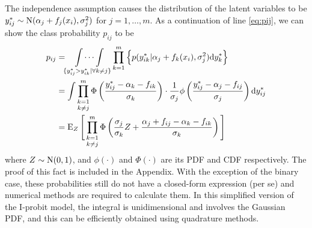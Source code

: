 The independence assumption causes the distribution of the latent variables to be $y_{ij}^* \sim \operatorname{N}(\alpha_j + f_j(x_i), \sigma_j^2)$ for $j=1,\dots,m$.
As a continuation of line \eqref{eq:pij}, we can show the class probability $p_{ij}$ to be
\begin{align*}
  p_{ij} 
  &= \idotsint\displaylimits_{\{y_{ij}^* > y_{ik}^* | \forall k \neq j\}} 
  \prod_{k=1}^m \Big\{ p(y_{ik}^*|\alpha_j + f_k(x_i), \sigma_j^2) \text{d} y_k^* \Big\} \\
  &= \int \mathop{\prod_{k=1}^m}_{k\neq j} 
  \Phi \left( \frac{y_{ij}^* - \alpha_k - f_{ik}}{\sigma_k} \right) \cdot
  \frac{1}{\sigma_j} \phi \left( \frac{y_{ij}^* - \alpha_j - f_{ij}}{\sigma_j} \right)  \text{d} y_{ij}^* \\
  &= \operatorname{E}_Z \Bigg[ \mathop{\prod_{k=1}^m}_{k\neq j} 
  \Phi \left(\frac{\sigma_j}{\sigma_k} Z + \frac{\alpha_j + f_{ij} - \alpha_k - f_{ik}}{\sigma_k} \right) \Bigg] \nonumber
\end{align*}
where $Z\sim\operatorname{N}(0,1)$, and $\phi(\cdot)$ and $\Phi(\cdot)$ are its PDF and CDF respectively.
The proof of this fact is included in the Appendix.
With the exception of the binary case, these probabilities still do not have a closed-form expression (per se) and numerical methods are required to calculate them.
In this simplified version of the I-probit model, the integral is unidimensional and involves the Gaussian PDF, and this can be efficiently obtained using quadrature methods.






